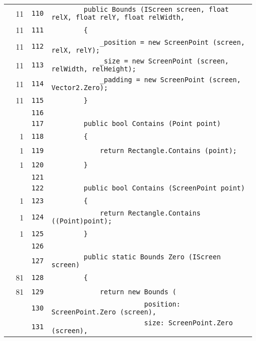 \documentclass[a4paper,10pt]{article}
\begin{document}
\begin{longtable}[l]{lrrl}
\cellcolor{green} & 11 & \verb~110~ & \verb~        public Bounds (IScreen screen, float relX, float relY, float relWidth,~\\
\cellcolor{green} & 11 & \verb~111~ & \verb~        {~\\
\cellcolor{green} & 11 & \verb~112~ & \verb~            _position = new ScreenPoint (screen, relX, relY);~\\
\cellcolor{green} & 11 & \verb~113~ & \verb~            _size = new ScreenPoint (screen, relWidth, relHeight);~\\
\cellcolor{green} & 11 & \verb~114~ & \verb~            _padding = new ScreenPoint (screen, Vector2.Zero);~\\
\cellcolor{green} & 11 & \verb~115~ & \verb~        }~\\
\cellcolor{gray} &  & \verb~116~ & \verb~~\\
\cellcolor{gray} &  & \verb~117~ & \verb~        public bool Contains (Point point)~\\
\cellcolor{green} & 1 & \verb~118~ & \verb~        {~\\
\cellcolor{green} & 1 & \verb~119~ & \verb~            return Rectangle.Contains (point);~\\
\cellcolor{green} & 1 & \verb~120~ & \verb~        }~\\
\cellcolor{gray} &  & \verb~121~ & \verb~~\\
\cellcolor{gray} &  & \verb~122~ & \verb~        public bool Contains (ScreenPoint point)~\\
\cellcolor{green} & 1 & \verb~123~ & \verb~        {~\\
\cellcolor{green} & 1 & \verb~124~ & \verb~            return Rectangle.Contains ((Point)point);~\\
\cellcolor{green} & 1 & \verb~125~ & \verb~        }~\\
\cellcolor{gray} &  & \verb~126~ & \verb~~\\
\cellcolor{gray} &  & \verb~127~ & \verb~        public static Bounds Zero (IScreen screen)~\\
\cellcolor{green} & 81 & \verb~128~ & \verb~        {~\\
\cellcolor{green} & 81 & \verb~129~ & \verb~            return new Bounds (~\\
\cellcolor{gray} &  & \verb~130~ & \verb~                       position: ScreenPoint.Zero (screen),~\\
\cellcolor{gray} &  & \verb~131~ & \verb~                       size: ScreenPoint.Zero (screen),~\\

\end{longtable}
\end{document}
